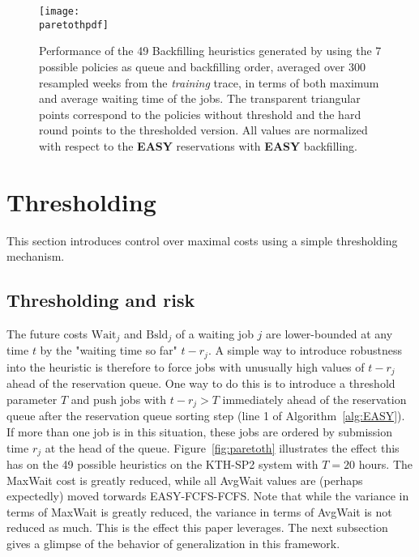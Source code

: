 \begin{figure*}[ht!]
  \centering
  \texttt{[image: \\paretothpdf]}

  \caption{Performance of the 49 Backfilling heuristics generated by using the
    7 possible policies as queue and backfilling order, averaged over 300
    resampled weeks from the \textit{training} trace, in terms of both maximum
    and average waiting time of the jobs. The transparent triangular points
    correspond to the policies without threshold and the hard round points to the
    thresholded version. All values are normalized with respect to the
    \textbf{EASY} reservations with \textbf{EASY} backfilling.}

\end{figure*}

\section{Thresholding}

This section introduces control over maximal costs using a simple thresholding
mechanism.

\subsection{Thresholding and risk}
\label{sec:th}

The future costs $\text{Wait}_j$ and $\text{Bsld}_j$ of a waiting job $j$
are lower-bounded at any time $t$ by the "waiting time so far" $t-r_j$. A
simple way to introduce robustness into the heuristic is therefore to force
jobs with unusually high values of $t-r_j$ ahead of the reservation queue. One
way to do this is to introduce a threshold parameter $T$ and push jobs with
$t-r_j>T$ immediately ahead of the reservation queue after the reservation
queue sorting step (line 1 of Algorithm~\ref{alg:EASY}). If more than one job
is in this situation, these jobs are ordered by submission time $r_j$ at the
head of the queue. Figure~\ref{fig:paretoth} illustrates the effect this has on
the 49 possible heuristics on the KTH-SP2 system with $T = 20$ hours. The
MaxWait cost is greatly reduced, while all AvgWait values are
(perhaps expectedly) moved torwards EASY-FCFS-FCFS. Note that while the
variance in terms of MaxWait is greatly reduced, the variance in terms
of AvgWait is not reduced as much. This is the effect this paper
leverages. The next subsection gives a glimpse of the behavior of
generalization in this framework.


